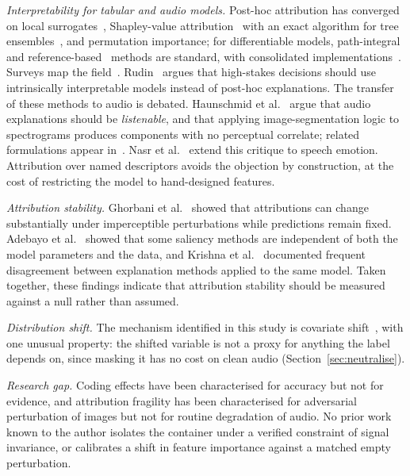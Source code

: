 \documentclass[lettersize,journal]{IEEEtran}
\begin{document}
\textit{Interpretability for tabular and audio models.} Post-hoc attribution
has converged on local surrogates~\cite{ribeiro2016lime}, Shapley-value
attribution~\cite{lundberg2017shap} with an exact algorithm for tree
ensembles~\cite{lundberg2020treeshap}, and permutation importance; for
differentiable models, path-integral~\cite{sundararajan2017ig} and
reference-based~\cite{shrikumar2017deeplift} methods are standard, with
consolidated implementations~\cite{kokhlikyan2020captum}. Surveys map the
field~\cite{guidotti2018survey}. Rudin~\cite{rudin2019stop} argues that
high-stakes decisions should use intrinsically interpretable models instead of
post-hoc explanations. The transfer of these methods to audio is debated.
Haunschmid et al.~\cite{haunschmid2020audiolime} argue that audio explanations
should be \emph{listenable}, and that applying image-segmentation logic to
spectrograms produces components with no perceptual correlate; related
formulations appear in~\cite{becker2018audiomnist,sotirou2024musiclime}. Nasr
et al.~\cite{nasr2025beyond} extend this critique to speech emotion.
Attribution over named descriptors avoids the objection by construction, at the
cost of restricting the model to hand-designed features.

\textit{Attribution stability.} Ghorbani et al.~\cite{ghorbani2019fragile}
showed that attributions can change substantially under imperceptible
perturbations while predictions remain fixed. Adebayo et
al.~\cite{adebayo2018sanity} showed that some saliency methods are independent
of both the model parameters and the data, and Krishna et
al.~\cite{krishna2022disagreement} documented frequent disagreement between
explanation methods applied to the same model. Taken together, these findings
indicate that attribution stability should be measured against a null rather
than assumed.

\textit{Distribution shift.} The mechanism identified in this study is
covariate shift~\cite{morenotorres2012shift}, with one unusual property: the
shifted variable is not a proxy for anything the label depends on, since
masking it has no cost on clean audio (Section~\ref{sec:neutralise}).

\textit{Research gap.} Coding effects have been characterised for accuracy but
not for evidence, and attribution fragility has been characterised for
adversarial perturbation of images but not for routine degradation of audio. No
prior work known to the author isolates the container under a verified
constraint of signal invariance, or calibrates a shift in feature importance
against a matched empty perturbation.
\end{document}
